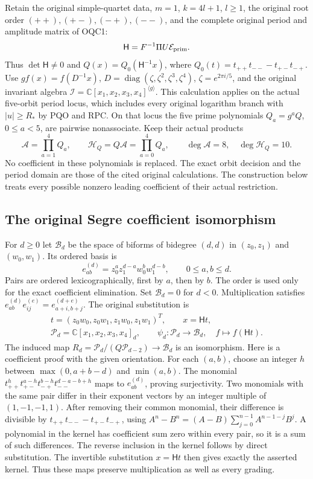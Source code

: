 \documentclass[11pt]{article}
\begin{document}
Retain the original simple-quartet data, $m=1$, $k=4l+1$,
$l\geq1$, the original root order $(++),(+-),(-+),(--)$, and
the complete original period and amplitude matrix of OQC1:
\[
                  \mathsf H=F^{-1}\Pi U\mathcal E_{\rm prim}.
\]
Thus $\det\mathsf H\ne0$ and
$Q(x)=Q_0(\mathsf H^{-1}x)$, where
$Q_0(t)=t_{++}t_{--}-t_{+-}t_{-+}$.
Use $g f(x)=f(D^{-1}x)$,
$D=\operatorname{diag}(\zeta,\zeta^2,\zeta^3,\zeta^4)$,
$\zeta=e^{2\pi i/5}$, and the original invariant algebra
$\mathscr I=\mathbb C[x_1,x_2,x_3,x_4]^{\langle g\rangle}$.
This calculation applies on the actual five-orbit period locus,
which includes every original logarithm branch with $|u|\geq R_*$
by PQO and RPC. On that locus the five prime polynomials
$Q_a=g^aQ$, $0\leq a<5$, are pairwise nonassociate. Keep their
actual products
\[
 \mathcal A=\prod_{a=1}^4Q_a,\qquad
 \mathcal H_Q=Q\mathcal A=\prod_{a=0}^4Q_a,
 \qquad \deg\mathcal A=8,\quad\deg\mathcal H_Q=10.
 \tag{OCF1}
\]
No coefficient in these polynomials is replaced. The exact orbit
decision and the period domain are those of the cited original
calculations. The construction below treats every possible nonzero
leading coefficient of their actual restriction.

\subsection{The original Segre coefficient isomorphism}

For $d\geq0$ let $\mathcal B_d$ be the space of biforms of
bidegree $(d,d)$ in $(z_0,z_1)$ and $(w_0,w_1)$. Its ordered basis is
\[
 e_{ab}^{(d)}=z_0^a z_1^{d-a}w_0^b w_1^{d-b},
 \qquad 0\leq a,b\leq d.
 \tag{OCF2}
\]
Pairs are ordered lexicographically, first by $a$, then by $b$.
The order is used only for the exact coefficient elimination.
Set $\mathcal B_d=0$ for $d<0$. Multiplication satisfies
$e_{ab}^{(d)}e_{ij}^{(e)}=e_{a+i,b+j}^{(d+e)}$.
The original substitution is
\[
 \begin{gathered}
 t=(z_0w_0,z_0w_1,z_1w_0,z_1w_1)^T,\qquad x=\mathsf Ht,\\
 \mathscr P_d=\mathbb C[x_1,x_2,x_3,x_4]_d,\qquad
 \psi_d:\mathscr P_d\longrightarrow\mathcal B_d,\quad
 f\longmapsto f(\mathsf Ht).
 \end{gathered}\tag{OCF3}
\]
The induced map
$R_d=\mathscr P_d/(Q\mathscr P_{d-2})\longrightarrow\mathcal B_d$
is an isomorphism. Here is a coefficient proof with the given
orientation. For each $(a,b)$, choose an integer
$h$ between $\max(0,a+b-d)$ and $\min(a,b)$. The monomial
$t_{++}^{h}t_{+-}^{a-h}t_{-+}^{b-h}t_{--}^{d-a-b+h}$ maps
to $e_{ab}^{(d)}$, proving surjectivity. Two monomials with
the same pair differ in their exponent vectors by an integer
multiple of $(1,-1,-1,1)$. After removing their common monomial,
their difference is divisible by $t_{++}t_{--}-t_{+-}t_{-+}$,
using $A^n-B^n=(A-B)\sum_{j=0}^{n-1}A^{n-1-j}B^j$.
A polynomial in the kernel has coefficient sum zero within every
pair, so it is a sum of such differences. The reverse inclusion
in the kernel follows by direct substitution. The invertible
substitution $x=\mathsf Ht$ then gives exactly the asserted kernel.
Thus these maps preserve multiplication as well as every grading.
\end{document}
